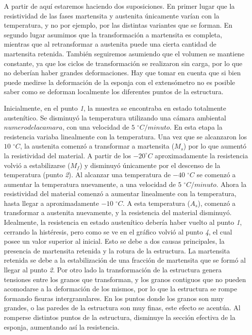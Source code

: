 \documentclass[a4paper,12pt,fleqn,twoside,openany]{book}
\begin{document}
 A partir de aquí estaremos haciendo dos suposiciones. En primer lugar que la resistividad de las fases martensita y austenita únicamente varían con la temperatura, y no por ejemplo, por las distintas variantes que se forman. En segundo lugar asumimos que la transformación a martensita es completa, mientras que al retransformar a austenita puede una cierta cantidad de martensita retenida. También seguiremos asumiendo que el volumen se mantiene constante, ya que los ciclos de transformación se realizaron sin carga, por lo que no deberían haber grandes deformaciones. Hay que tomar en cuenta que si bien puede medirse la deformación de la esponja con el extensómetro no es posible saber como se deforman localmente los diferentes puntos de la estructura.
 
 
 Inicialmente, en el punto \textit{1}, la muestra se encontraba en estado totalmente austenítico. Se disminuyó la temperatura utilizando una cámara ambiental $numero de la camara$, con una velocidad de $5$ $^\circ C/minuto$. En esta etapa la resistencia variaba linealmente con la temperatura.
 Una vez que se alcanzaron los $10$ $^\circ C$, la austenita comenzó a transformar a martensita ($M_s$) por lo que aumentó la resistividad del material. A partir de los $-20^\circ C$ aproximadamente la resistencia volvió a estabilizarse ($M_f$) y disminuyó únicamente por el descenso de la temperatura (punto \textit{2}).     
 Al alcanzar una temperatura de $-40$ $^\circ C$ se comenzó a aumentar la temperatura nuevamente, a una velocidad de $5$ $^\circ C/minuto$. Ahora la resistividad del material comenzó a aumentar linealmente con la temperatura, hasta llegar a aproximadamente $-10$ $^\circ C$. A esta temperatura ($A_s$), comenzó a transformar a austenita nuevamente, y la resistencia del material disminuyó. Idealmente, la resistencia en estado austenítico debería haber vuelto al punto \textit{1}, cerrando la histéresis, pero como se ve en el gráfico volvió al punto \textit{4}, el cual posee un valor superior al inicial. Esto se debe a dos causas principales, la presencia de martensita retenida y la rotura de la estructura. La martensita retenida se debe a la estabilización de una fracción de martensita que se formó al llegar al punto \textit{2}. Por otro lado la transformación de la estructura genera tensiones entre los granos que transforman, y los granos contiguos que no pueden acomodarse a la deformación de los mismos, por lo que la estructura se rompe formando fisuras intergranulares. En los puntos donde los granos son muy grandes, o las paredes de la estructura son muy finas, este efecto se acentúa. Al romperse distintos puntos de la estructura, disminuye la sección efectiva de la esponja, aumentando así la resistencia.
\end{document}
